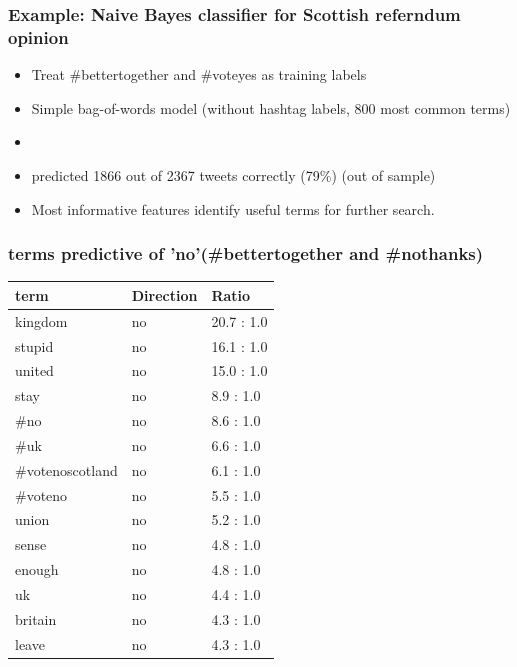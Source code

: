\documentclass[11pt, table, dvipsnames]{beamer}
\begin{document}
\begin{frame}
  \frametitle{Example: Naive Bayes classifier for Scottish referndum opinion} 
  \begin{itemize}
  \item Treat \#bettertogether and \#voteyes as training labels 
  \item Simple bag-of-words model (without hashtag labels, 800 most common terms)
  \item   \item predicted 1866 out of 2367 tweets correctly (79\%) (out of sample)
  \item Most informative features identify useful terms for further search.
  \end{itemize}
\end{frame}


\begin{frame}
\frametitle{terms predictive of 'no'(\#bettertogether and \#nothanks)}
  \begin{table}[!htbp]\centering
\begin{tabular}{p{4cm}p{1.5cm}p{3cm}}
 \hline
term & Direction & Ratio \\
\hline
kingdom        &         no   &    20.7 : 1.0 \\
stupid         &       no    &     16.1 : 1.0 \\
united          &       no    &     15.0 : 1.0 \\
stay           &     no    &      8.9 : 1.0 \\
\#no 		&    no    &       8.6 : 1.0 \\
\#uk		&    no    &      6.6 : 1.0 \\
\#votenoscotland &   no &     6.1 : 1.0 \\
\#voteno 	&    no &        5.5 : 1.0\\
union &               no     &      5.2 : 1.0\\
sense &                 no    &      4.8 : 1.0\\
enough &                no    &      4.8 : 1.0\\
uk &                 no      &      4.4 : 1.0\\
britain &                 no    &      4.3 : 1.0\\
leave &                 no    &      4.3 : 1.0\\
\hline
\end{tabular}
\end{table}
\end{frame}
\end{document}
